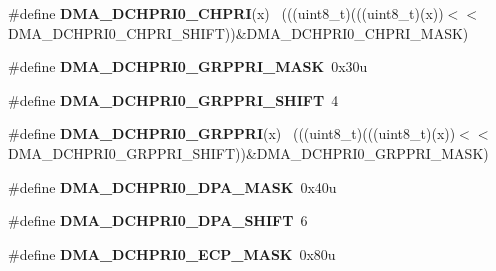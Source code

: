 \begin{DoxyCompactItemize}
\item 
\hypertarget{group___d_m_a___register___masks_ga50e072eb63354ece080f7b0ad0f0bd91}{}\#define {\bfseries D\+M\+A\+\_\+\+D\+C\+H\+P\+R\+I0\+\_\+\+C\+H\+P\+R\+I}(x)                                      ~(((uint8\+\_\+t)(((uint8\+\_\+t)(x))$<$$<$D\+M\+A\+\_\+\+D\+C\+H\+P\+R\+I0\+\_\+\+C\+H\+P\+R\+I\+\_\+\+S\+H\+I\+F\+T))\&D\+M\+A\+\_\+\+D\+C\+H\+P\+R\+I0\+\_\+\+C\+H\+P\+R\+I\+\_\+\+M\+A\+S\+K)\label{group___d_m_a___register___masks_ga50e072eb63354ece080f7b0ad0f0bd91}

\item 
\hypertarget{group___d_m_a___register___masks_gad79314f97ac9eb4b46ac75b15ce8b216}{}\#define {\bfseries D\+M\+A\+\_\+\+D\+C\+H\+P\+R\+I0\+\_\+\+G\+R\+P\+P\+R\+I\+\_\+\+M\+A\+S\+K}~0x30u\label{group___d_m_a___register___masks_gad79314f97ac9eb4b46ac75b15ce8b216}

\item 
\hypertarget{group___d_m_a___register___masks_ga0b622d9c2d6d36c74c5974adac367b1b}{}\#define {\bfseries D\+M\+A\+\_\+\+D\+C\+H\+P\+R\+I0\+\_\+\+G\+R\+P\+P\+R\+I\+\_\+\+S\+H\+I\+F\+T}~4\label{group___d_m_a___register___masks_ga0b622d9c2d6d36c74c5974adac367b1b}

\item 
\hypertarget{group___d_m_a___register___masks_ga20177d9ea36a168b5328d309accba2d1}{}\#define {\bfseries D\+M\+A\+\_\+\+D\+C\+H\+P\+R\+I0\+\_\+\+G\+R\+P\+P\+R\+I}(x)                                    ~(((uint8\+\_\+t)(((uint8\+\_\+t)(x))$<$$<$D\+M\+A\+\_\+\+D\+C\+H\+P\+R\+I0\+\_\+\+G\+R\+P\+P\+R\+I\+\_\+\+S\+H\+I\+F\+T))\&D\+M\+A\+\_\+\+D\+C\+H\+P\+R\+I0\+\_\+\+G\+R\+P\+P\+R\+I\+\_\+\+M\+A\+S\+K)\label{group___d_m_a___register___masks_ga20177d9ea36a168b5328d309accba2d1}

\item 
\hypertarget{group___d_m_a___register___masks_gad746dcaccbad5591a4c76f397bced727}{}\#define {\bfseries D\+M\+A\+\_\+\+D\+C\+H\+P\+R\+I0\+\_\+\+D\+P\+A\+\_\+\+M\+A\+S\+K}~0x40u\label{group___d_m_a___register___masks_gad746dcaccbad5591a4c76f397bced727}

\item 
\hypertarget{group___d_m_a___register___masks_ga58cc686267da58f32d00143ba6aa5044}{}\#define {\bfseries D\+M\+A\+\_\+\+D\+C\+H\+P\+R\+I0\+\_\+\+D\+P\+A\+\_\+\+S\+H\+I\+F\+T}~6\label{group___d_m_a___register___masks_ga58cc686267da58f32d00143ba6aa5044}

\item 
\hypertarget{group___d_m_a___register___masks_ga691357e0e7e7aea1147f26d3e7b39ad7}{}\#define {\bfseries D\+M\+A\+\_\+\+D\+C\+H\+P\+R\+I0\+\_\+\+E\+C\+P\+\_\+\+M\+A\+S\+K}~0x80u\label{group___d_m_a___register___masks_ga691357e0e7e7aea1147f26d3e7b39ad7}


\end{DoxyCompactItemize}
